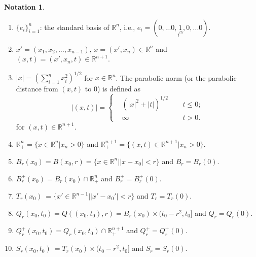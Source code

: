\documentclass[preprint,12pt]{elsarticle}
\theoremstyle{definition}
\newtheorem{notation}[theorem]{Notation}
\theoremstyle{remark}
\numberwithin{equation}{section}
\begin{document}
\begin{notation}\label{no1.1}
\begin{enumerate}~~\\
\item $\{e_i\}^{n}_{i=1}$: the standard basis of $\mathbb{R}^n$, i.e., $e_i=(0,...0,\underset{i^{th}}{1},0,...0)$.
\item $x'=(x_1,x_2,...,x_{n-1})$, $x=(x',x_n) \in \mathbb{R}^{n}$ and $(x,t)=(x',x_n,t)\in \mathbb{R}^{n+1}$.
\item $|x|=\left(\sum_{i=1}^{n} x_i^2\right)^{1/2}$ for $x\in \mathbb{R}^n$. The parabolic norm (or the parabolic distance from $(x,t)$ to $0$) is defined as
\begin{equation*}
|(x,t)|=\left\{\begin{aligned}
&(|x|^2+|t|)^{1/2} &&~~t\leq 0;\\
&\infty && ~~t>0.
\end{aligned}\right.
\end{equation*}
for $(x,t)\in \mathbb{R}^{n+1}$.
\item $\mathbb{R}^n_+=\{x\in \mathbb{R}^n\big|x_n>0\}$ and $\mathbb{R}^{n+1}_+=\{(x,t)\in \mathbb{R}^{n+1}\big|x_n>0\}$.
\item $B_r(x_0)=B(x_0,r)=\{x\in \mathbb{R}^{n}\big| |x-x_0|<r\}$ and $B_r=B_r(0)$.
\item $B_r^+(x_0)=B_r(x_0)\cap \mathbb{R}^n_+$ and $B_r^+=B^+_r(0)$.
\item $T_r(x_0)\ =\{x' \in \mathbb{R}^{n-1}\big| |x'-x_0'|<r\}$ and $T_r=T_r(0)$.
\item $Q_r(x_0,t_0)=Q((x_0,t_0),r)=B_r(x_0)\times (t_0-r^2,t_0]$ and $Q_r=Q_r(0)$.
\item $Q_r^+(x_0,t_0)=Q_r(x_0,t_0)\cap \mathbb{R}^{n+1}_+$ and $Q_r^+=Q^+_r(0)$.
\item $S_r(x_0,t_0)\ =T_r(x_0)\times (t_0-r^2,t_0]$ and $S_r=S_r(0)$.

\end{enumerate}
\end{notation}
\end{document}
